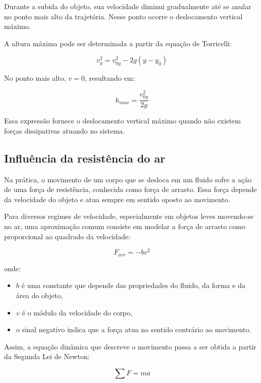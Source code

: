 \documentclass[a4paper,12pt]{article}
\begin{document}
Durante a subida do objeto, sua velocidade diminui gradualmente até se anular no ponto mais alto da trajetória. Nesse ponto ocorre o deslocamento vertical máximo.

A altura máxima pode ser determinada a partir da equação de Torricelli:

\begin{equation}
v_{y}^2 = v_{0y}^2 - 2g(y - y_0)
\end{equation}

No ponto mais alto, \(v=0\), resultando em:

\begin{equation}
h_{max} = \frac{v_{0y}^2}{2g}
\end{equation}

Essa expressão fornece o deslocamento vertical máximo quando não existem forças dissipativas atuando no sistema.

\subsection*{Influência da resistência do ar}

Na prática, o movimento de um corpo que se desloca em um fluido sofre a ação de uma força de resistência, conhecida como força de arrasto. Essa força depende da velocidade do objeto e atua sempre em sentido oposto ao movimento.

Para diversos regimes de velocidade, especialmente em objetos leves movendo-se no ar, uma aproximação comum consiste em modelar a força de arrasto como proporcional ao quadrado da velocidade:

\begin{equation}
F_{arr} = -b v^2
\end{equation}

onde:

\begin{itemize}
\item \(b\) é uma constante que depende das propriedades do fluido, da forma e da área do objeto,
\item \(v\) é o módulo da velocidade do corpo,
\item o sinal negativo indica que a força atua no sentido contrário ao movimento.
\end{itemize}

Assim, a equação dinâmica que descreve o movimento passa a ser obtida a partir da Segunda Lei de Newton:

\begin{equation}
\sum F = ma
\end{equation}
\end{document}
